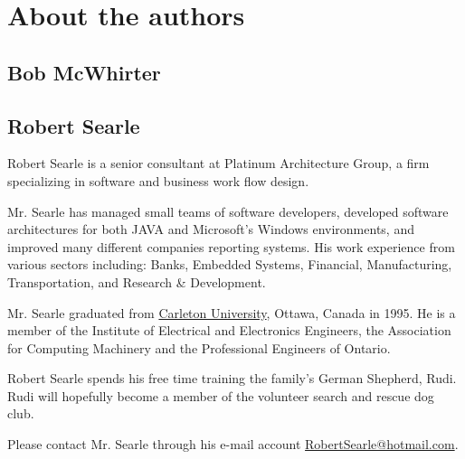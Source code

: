 \chapter{About the authors}

\section{Bob McWhirter}

\section {Robert Searle}

Robert Searle is a senior consultant at Platinum Architecture 
Group, a firm specializing in software and business work flow design.

Mr. Searle has managed small teams of software developers, 
developed software architectures for both JAVA and Microsoft's 
Windows environments, and improved many different companies 
reporting systems. His work experience from various sectors 
including: Banks, Embedded Systems, Financial, Manufacturing, 
Transportation, and Research \& Development.

Mr. Searle graduated from \href{http://www.carleton.ca/}{Carleton
University}, Ottawa, Canada in 1995. He is a member of the 
Institute of Electrical and Electronics Engineers, the Association 
for Computing Machinery and the Professional Engineers of Ontario. 

Robert Searle spends his free time training the family's 
German Shepherd, Rudi. Rudi will hopefully become a member 
of the volunteer search and rescue dog club.

Please contact Mr. Searle through his e-mail account 
\href{mailto:robertsearle@hotmail.com}{RobertSearle@hotmail.com}.

